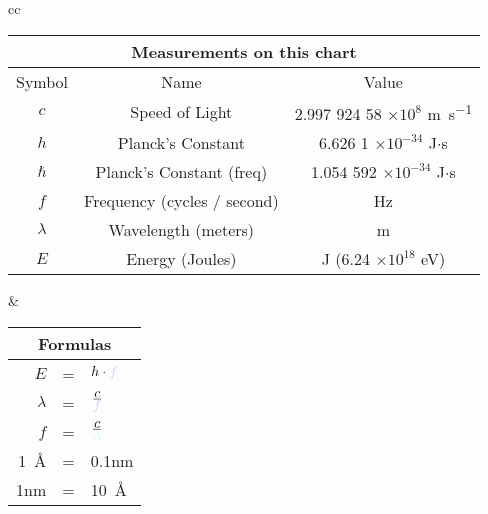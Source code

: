 {\centering
	\begin{tabular}{cc}
		\begin{tabular}[t]{|c|c|c|}\hline
		\multicolumn{3}{|c|}{\bfseries Measurements on this chart}\\ \hline
		Symbol & Name & Value\\ \hline
		\rule[0mm]{0mm}{4mm}$c$        & Speed of Light                & 2.997 924 58 $\times 10^{8}$ \si{\metre\per\second}\\
		$h$        & Planck's Constant             & 6.626 1 $\times 10^{-34}$  \si{\joule}$\cdot$\si{\second}\\
		$\hbar$    & Planck's Constant (freq)      & 1.054 592 $\times 10^{-34}$  \si{\joule}$\cdot$\si{\second}\\
		\textcolor{FColor}{$f$}        & Frequency (cycles / second) & Hz\\
		\textcolor{WColor}{$\lambda$}  & Wavelength (meters)           & \si{\metre}\\
		\textcolor{EColor}{$E$}        & Energy (Joules)               & J (6.24 $\times 10^{18}$ \si{\electronvolt})\\
		\hline
		\end{tabular}&
		\setlength{\tabcolsep}{2pt}
		\begin{tabular}[t]{|rcl|}\hline
			\multicolumn{3}{|c|}{\bfseries Formulas}\\ \hline
			\rule[0mm]{0mm}{4mm}{\textcolor{EColor}{$E$}}         &=& $h \cdot \textcolor{FColor}{f}$\rule[0.1in]{0in}{0.01in}\\
			\rule[0mm]{0mm}{4mm}{\textcolor{WColor}{$\lambda$}}   &=& $\frac{\D c}{\D \textcolor{FColor}{f}}$\rule[-0.1in]{0in}{0.15in}\\
			\rule[0mm]{0mm}{4mm}{\textcolor{FColor}{$f$}}         &=& $\frac{\D c}{\D \textcolor{WColor}{\lambda}}$\rule[-0.1in]{0in}{0.15in} \\
			\rule{0in}{0.15in}\si{1\angstrom} &=& 0.1\si{\nano\metre}\\
			\rule[0mm]{0mm}{4mm}1\si{\nano\metre}  &=& \si{10\angstrom}\\ \hline
		\end{tabular}
	\end{tabular}\\
}

%
{


}



